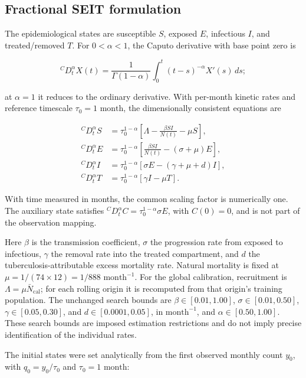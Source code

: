 \documentclass[pdflatex,sn-mathphys-ay]{sn-jnl}
\begin{document}
\subsection{Fractional SEIT formulation}

The epidemiological states are susceptible $S$, exposed $E$, infectious $I$, and treated/removed $T$. For $0<\alpha<1$, the Caputo derivative with base point zero is

\[
{}^C D_t^\alpha X(t)=\frac{1}{\Gamma(1-\alpha)}\int_0^t(t-s)^{-\alpha}X'(s)\,ds;
\]

at $\alpha=1$ it reduces to the ordinary derivative. With per-month kinetic rates and reference timescale $\tau_0=1\text{ month}$, the dimensionally consistent equations are

\[
\begin{aligned}
{}^C D_t^\alpha S &=\tau_0^{1-\alpha}\left[\Lambda-\frac{\beta SI}{N(t)}-\mu S\right],\\
{}^C D_t^\alpha E &=\tau_0^{1-\alpha}\left[\frac{\beta SI}{N(t)}-(\sigma+\mu)E\right],\\
{}^C D_t^\alpha I &=\tau_0^{1-\alpha}\left[\sigma E-(\gamma+\mu+d)I\right],\\
{}^C D_t^\alpha T &=\tau_0^{1-\alpha}\left[\gamma I-\mu T\right].
\end{aligned}
\]

With time measured in months, the common scaling factor is numerically one. The auxiliary state satisfies ${}^C D_t^\alpha C=\tau_0^{1-\alpha}\sigma E$, with $C(0)=0$, and is not part of the observation mapping.

Here $\beta$ is the transmission coefficient, $\sigma$ the progression rate from exposed to infectious, $\gamma$ the removal rate into the treated compartment, and $d$ the tuberculosis-attributable excess mortality rate. Natural mortality is fixed at $\mu=1/(74\times12)=1/888\text{ month}^{-1}$. For the global calibration, recruitment is $\Lambda=\mu\bar N_{\mathrm{cal}}$; for each rolling origin it is recomputed from that origin's training population. The unchanged search bounds are $\beta\in[0.01,1.00]$, $\sigma\in[0.01,0.50]$, $\gamma\in[0.05,0.30]$, and $d\in[0.0001,0.05]$, in $\text{month}^{-1}$, and $\alpha\in[0.50,1.00]$. These search bounds are imposed estimation restrictions and do not imply precise identification of the individual rates.

The initial states were set analytically from the first observed monthly count $y_0$, with $q_0=y_0/\tau_0$ and $\tau_0=1\text{ month}$:
\end{document}
